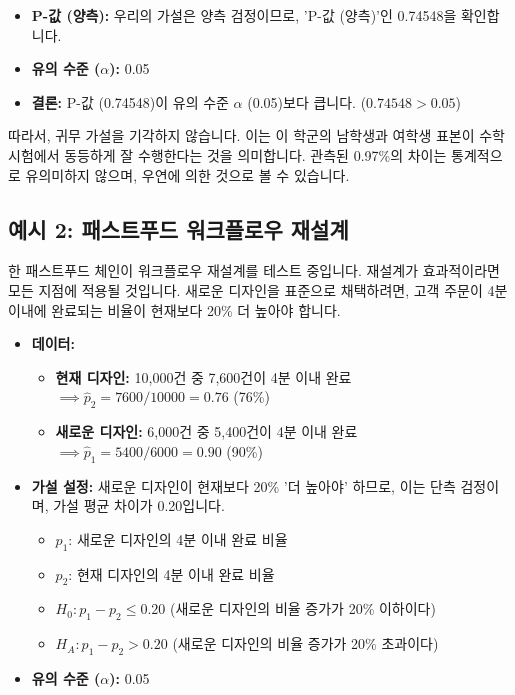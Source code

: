 \documentclass[11pt,a4paper]{book}
\theoremstyle{definition}
\begin{document}
\begin{itemize}
    \item \textbf{P-값 (양측):} 우리의 가설은 양측 검정이므로, 'P-값 (양측)'인 0.74548을 확인합니다.
    \item \textbf{유의 수준 ($\alpha$):} 0.05
    \item \textbf{결론:} P-값 (0.74548)이 유의 수준 $\alpha$ (0.05)보다 큽니다. ($0.74548 > 0.05$)
\end{itemize}
따라서, 귀무 가설을 기각하지 않습니다. 이는 이 학군의 남학생과 여학생 표본이 수학 시험에서 동등하게 잘 수행한다는 것을 의미합니다. 관측된 0.97\%의 차이는 통계적으로 유의미하지 않으며, 우연에 의한 것으로 볼 수 있습니다.

\subsection{예시 2: 패스트푸드 워크플로우 재설계}
\begin{examplebox}[title=시나리오:]
한 패스트푸드 체인이 워크플로우 재설계를 테스트 중입니다. 재설계가 효과적이라면 모든 지점에 적용될 것입니다. 새로운 디자인을 표준으로 채택하려면, 고객 주문이 4분 이내에 완료되는 비율이 현재보다 20\% 더 높아야 합니다.
\end{examplebox}

\begin{itemize}
    \item \textbf{데이터:}
    \begin{itemize}
        \item \textbf{현재 디자인:} 10,000건 중 7,600건이 4분 이내 완료 $\implies \hat{p}_2 = 7600/10000 = 0.76$ (76\%)
        \item \textbf{새로운 디자인:} 6,000건 중 5,400건이 4분 이내 완료 $\implies \hat{p}_1 = 5400/6000 = 0.90$ (90\%)
    \end{itemize}
    \item \textbf{가설 설정:} 새로운 디자인이 현재보다 20\% '더 높아야' 하므로, 이는 단측 검정이며, 가설 평균 차이가 0.20입니다.
    \begin{itemize}
        \item $p_1$: 새로운 디자인의 4분 이내 완료 비율
        \item $p_2$: 현재 디자인의 4분 이내 완료 비율
        \item $H_0: p_1 - p_2 \le 0.20$ (새로운 디자인의 비율 증가가 20\% 이하이다)
        \item $H_A: p_1 - p_2 > 0.20$ (새로운 디자인의 비율 증가가 20\% 초과이다)
    \end{itemize}
    \item \textbf{유의 수준 ($\alpha$):} 0.05
\end{itemize}
\end{document}
